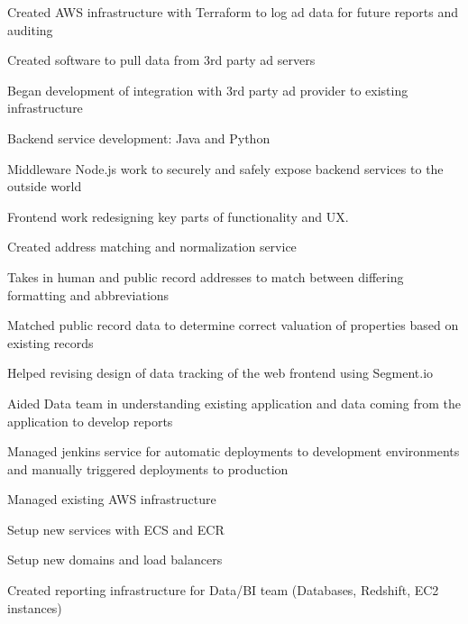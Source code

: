 \documentclass[table,tmargin=1in,bmargin=1in,letterpaper]{resume}
\begin{document}
\begin{compactitem}
\item Created AWS infrastructure with Terraform to log ad data for future reports and auditing
\item Created software to pull data from 3rd party ad servers
\item Began development of integration with 3rd party ad provider to existing infrastructure
\end{compactitem}

\begin{compactitem}
\item Backend service development: Java and Python
\item Middleware Node.js work to securely and safely expose backend services to the outside world
\item Frontend work redesigning key parts of functionality and UX.
\item Created address matching and normalization service
  \begin{compactitem}
  \item Takes in human and public record addresses to match between differing formatting and abbreviations
  \item Matched public record data to determine correct valuation of properties based on existing records
  \end{compactitem}
\item Helped revising design of data tracking of the web frontend using Segment.io
\item Aided Data team in understanding existing application and data coming from the application to develop reports
\item Managed jenkins service for automatic deployments to development environments and manually triggered deployments to production
\item Managed existing AWS infrastructure
  \begin{compactitem}
  \item Setup new services with ECS and ECR
  \item Setup new domains and load balancers
  \item Created reporting infrastructure for Data/BI team (Databases, Redshift, EC2 instances)
  \end{compactitem}
\end{compactitem}
\end{document}

